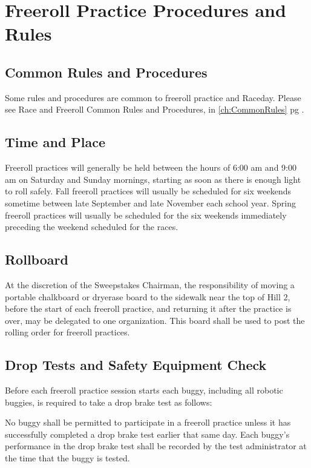 \section{Freeroll Practice Procedures and Rules}
\label{sec:FreerollRules}

\subsection{Common Rules and Procedures}
	Some rules and procedures are common to freeroll practice and Raceday. Please see Race and Freeroll Common Rules and Procedures, in \ref{ch:CommonRules} pg \pageref{ch:CommonRules}.

\subsection{Time and Place}

	Freeroll practices will generally be held between the hours of 6:00 am and 9:00 am on Saturday and Sunday mornings, starting as soon as there is enough light to roll safely. Fall freeroll practices will usually be scheduled for six weekends sometime between late September and late November each school year. Spring freeroll practices will usually be scheduled for the six weekends immediately preceding the weekend scheduled for the races.

\subsection{Rollboard}

	At the discretion of the Sweepstakes Chairman, the responsibility of moving a portable chalkboard or dryerase board to the sidewalk near the top of Hill 2, before the start of each freeroll practice, and returning it after the practice is over, may be delegated to one organization. This board shall be used to post the rolling order for freeroll practices.

\subsection{Drop Tests and Safety Equipment Check}

	Before each freeroll practice session starts each buggy, including all robotic buggies, is required to take a drop brake test as follows: 
	
	No buggy shall be permitted to participate in a freeroll practice unless it has successfully completed a drop brake test earlier that same day. Each buggy's performance in the drop brake test shall be recorded by the test administrator at the time that the buggy is tested.

